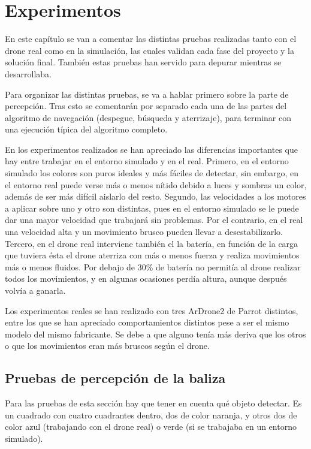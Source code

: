 \chapter{Experimentos}\label{cap.experimentos}

\hspace{1cm} En este cap\'itulo se van a comentar las distintas pruebas realizadas tanto con el drone real como en la simulaci\'on, las cuales validan cada fase del proyecto y la soluci\'on final. Tambi\'en estas pruebas han servido para depurar mientras se desarrollaba. 

\hspace{1cm} Para organizar las distintas pruebas, se va a hablar primero sobre la parte de percepci\'on. Tras esto se comentar\'an por separado cada una de las partes del algoritmo de navegaci\'on (despegue, b\'usqueda y aterrizaje), para terminar con una ejecuci\'on t\'ipica del algoritmo completo.

\hspace{1cm} En los experimentos realizados se han apreciado las diferencias importantes que hay entre trabajar en el entorno simulado y en el real. Primero, en el entorno simulado los colores son puros ideales y m\'as f\'aciles de detectar, sin embargo, en el entorno real puede verse m\'as o menos n\'itido  debido a luces y sombras un color, adem\'as de ser m\'as dif\'icil aislarlo del resto. Segundo, las velocidades a los motores a aplicar sobre uno y otro son distintas, pues en el entorno simulado se le puede dar una mayor velocidad que trabajar\'a sin problemas. Por el contrario, en el real una velocidad alta y un movimiento brusco pueden llevar a desestabilizarlo. Tercero, en el drone real interviene tambi\'en el la bater\'ia, en funci\'on de la carga que tuviera \'esta el drone aterriza con m\'as o menos fuerza y realiza movimientos m\'as o menos fluidos. Por debajo de 30\% de bater\'ia no permit\'ia al drone realizar todos los movimientos, y en algunas ocasiones perd\'ia altura, aunque despu\'es volv\'ia a ganarla. 

\hspace{1cm} Los experimentos reales se han realizado con tres ArDrone2 de Parrot distintos, entre los que se han apreciado comportamientos distintos pese a ser el mismo modelo del mismo fabricante. Se debe a que alguno ten\'ia m\'as deriva que los otros o que los movimientos eran m\'as bruscos seg\'un el drone.


\section{Pruebas de percepci\'on de la baliza}\label{sec:percepcion}
\hspace{1cm} Para las pruebas de esta secci\'on hay que tener en cuenta qu\'e objeto detectar. Es un cuadrado con cuatro cuadrantes dentro, dos de color naranja, y otros dos de color azul (trabajando con el drone real) o verde (si se trabajaba en un entorno simulado). 

